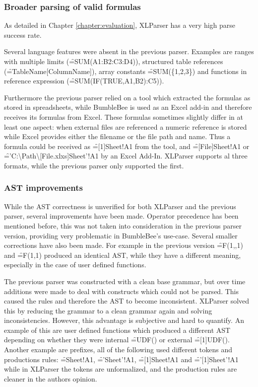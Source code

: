\subsubsection{Broader parsing of valid formulas}

As detailed in Chapter \ref{chapter:evaluation}, XLParser has a very high parse success rate.

Several language features were absent in the previous parser.
Examples are ranges with multiple limits (\f{=SUM(A1:B2:C3:D4)}), structured table references (\f{=TableName[ColumnName]}), array constants \f{=SUM(\{1,2,3\})} and functions in reference expression (\f{=SUM(IF(TRUE,A1,B2):C5)}).

Furthermore the previous parser relied on a tool which extracted the formulas as stored in spreadsheets, while BumbleBee is used as an Excel add-in and therefore receives its formulas from Excel.
These formulas sometimes slightly differ in at least one aspect: when external files are referenced a numeric reference is stored while Excel provides either the filename or the file path and name.
Thus a formula could be received as \f{=[1]Sheet!A1} from the tool, and \f{=[File]Sheet!A1} or \f{='C:\textbackslash Path\textbackslash [File.xlxs]Sheet'!A1} by an Excel Add-In.
XLParser supports al three formats, while the previous parser only supported the first.

\subsubsection{AST improvements}


While the AST correctness is unverified for both XLParser and the previous parser, several improvements have been made.
Operator precedence has been mentioned before, this was not taken into consideration in the previous parser version, providing very problematic in BumbleBee's use-case.
Several smaller corrections have also been made.
For example in the previous version \f{=F(1,,1)} and \f{=F(1,1)} produced an identical AST, while they have a different meaning, especially in the case of user defined functions.

The previous parser was constructed with a clean base grammar, but over time additions were made to deal with constructs which could not be parsed.
This caused the rules and therefore the AST to become inconsistent.
XLParser solved this by reducing the grammar to a clean grammar again and solving inconsistencies.
However, this advantage is subjective and hard to quantify.
An example of this are user defined functions which produced a different AST depending on whether they were internal \f{=UDF()} or external \f{=[1]UDF()}.
Another example are prefixes, all of the following used different tokens and productions rules: \f{=Sheet!A1}, \f{='Sheet'!A1}, \f{=[1]Sheet!A1} and \f{='[1]Sheet'!A1} while in XLParser the tokens are unformalized, and the production rules are cleaner in the authors opinion.